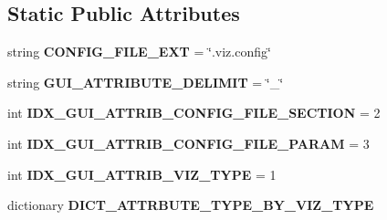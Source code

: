 \subsection*{Static Public Attributes}
\begin{DoxyCompactItemize}
\item 
string {\bfseries C\+O\+N\+F\+I\+G\+\_\+\+F\+I\+L\+E\+\_\+\+E\+XT} = \char`\"{}.viz.\+config\char`\"{}\hypertarget{classnegui_1_1pglineregressconfigfilemaker_1_1PGLineRegressConfigFileMaker_a6b4894076df89af5ed2567e36ad4abe6}{}\label{classnegui_1_1pglineregressconfigfilemaker_1_1PGLineRegressConfigFileMaker_a6b4894076df89af5ed2567e36ad4abe6}

\item 
string {\bfseries G\+U\+I\+\_\+\+A\+T\+T\+R\+I\+B\+U\+T\+E\+\_\+\+D\+E\+L\+I\+M\+IT} = \char`\"{}\+\_\+\char`\"{}\hypertarget{classnegui_1_1pglineregressconfigfilemaker_1_1PGLineRegressConfigFileMaker_ad96235a56b13ade3407f03d60ccb80ce}{}\label{classnegui_1_1pglineregressconfigfilemaker_1_1PGLineRegressConfigFileMaker_ad96235a56b13ade3407f03d60ccb80ce}

\item 
int {\bfseries I\+D\+X\+\_\+\+G\+U\+I\+\_\+\+A\+T\+T\+R\+I\+B\+\_\+\+C\+O\+N\+F\+I\+G\+\_\+\+F\+I\+L\+E\+\_\+\+S\+E\+C\+T\+I\+ON} = 2\hypertarget{classnegui_1_1pglineregressconfigfilemaker_1_1PGLineRegressConfigFileMaker_ac15f5f204fe7e2593eea22b936828991}{}\label{classnegui_1_1pglineregressconfigfilemaker_1_1PGLineRegressConfigFileMaker_ac15f5f204fe7e2593eea22b936828991}

\item 
int {\bfseries I\+D\+X\+\_\+\+G\+U\+I\+\_\+\+A\+T\+T\+R\+I\+B\+\_\+\+C\+O\+N\+F\+I\+G\+\_\+\+F\+I\+L\+E\+\_\+\+P\+A\+R\+AM} = 3\hypertarget{classnegui_1_1pglineregressconfigfilemaker_1_1PGLineRegressConfigFileMaker_ac0175503ae8f61a33a01c2d5a18f8440}{}\label{classnegui_1_1pglineregressconfigfilemaker_1_1PGLineRegressConfigFileMaker_ac0175503ae8f61a33a01c2d5a18f8440}

\item 
int {\bfseries I\+D\+X\+\_\+\+G\+U\+I\+\_\+\+A\+T\+T\+R\+I\+B\+\_\+\+V\+I\+Z\+\_\+\+T\+Y\+PE} = 1\hypertarget{classnegui_1_1pglineregressconfigfilemaker_1_1PGLineRegressConfigFileMaker_a6f5ac215b4e81749b3cedc687c4a00bb}{}\label{classnegui_1_1pglineregressconfigfilemaker_1_1PGLineRegressConfigFileMaker_a6f5ac215b4e81749b3cedc687c4a00bb}

\item 
dictionary {\bfseries D\+I\+C\+T\+\_\+\+A\+T\+T\+R\+B\+U\+T\+E\+\_\+\+T\+Y\+P\+E\+\_\+\+B\+Y\+\_\+\+V\+I\+Z\+\_\+\+T\+Y\+PE}
\end{DoxyCompactItemize}


